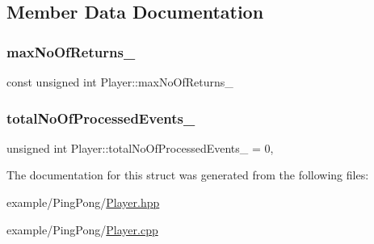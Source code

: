 \subsection{Member Data Documentation}
\mbox{\label{struct_player_aa6f40e0827e40725d7861e6e4cd8b2e2}} 
\subsubsection{\texorpdfstring{max\+No\+Of\+Returns\+\_\+}{maxNoOfReturns\_}}
{\footnotesize\ttfamily const unsigned int Player\+::max\+No\+Of\+Returns\+\_\+\hspace{0.3cm}{\ttfamily [private]}}

\mbox{\label{struct_player_aee40ef0e7dcbcaf125e0383d098b4508}} 
\subsubsection{\texorpdfstring{total\+No\+Of\+Processed\+Events\+\_\+}{totalNoOfProcessedEvents\_}}
{\footnotesize\ttfamily unsigned int Player\+::total\+No\+Of\+Processed\+Events\+\_\+ = 0\hspace{0.3cm}{\ttfamily [static]}, {\ttfamily [private]}}



The documentation for this struct was generated from the following files\+:\begin{DoxyCompactItemize}
\item 
example/\+Ping\+Pong/\mbox{\hyperlink{_player_8hpp}{Player.\+hpp}}\item 
example/\+Ping\+Pong/\mbox{\hyperlink{_player_8cpp}{Player.\+cpp}}\end{DoxyCompactItemize}
